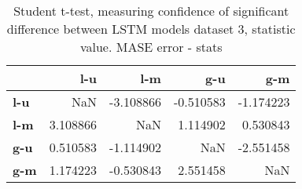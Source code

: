 \begin{table}[H]
\centering
\caption{Student t-test, measuring confidence of significant difference between LSTM models dataset 3, statistic value. MASE error - stats}
\label{table:ttest-stats-lstm-experiments-MASE-dataset-3}
\begin{tabular}{lrrrr}
\toprule
{} &       l-u &       l-m &       g-u &       g-m \\
\midrule
\textbf{l-u} &       NaN & -3.108866 & -0.510583 & -1.174223 \\
\textbf{l-m} &  3.108866 &       NaN &  1.114902 &  0.530843 \\
\textbf{g-u} &  0.510583 & -1.114902 &       NaN & -2.551458 \\
\textbf{g-m} &  1.174223 & -0.530843 &  2.551458 &       NaN \\
\bottomrule
\end{tabular}
\end{table}
